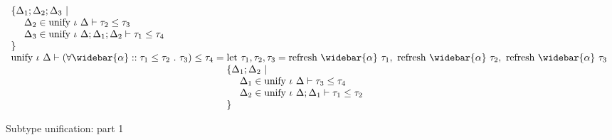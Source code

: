 \documentclass[manuscript]{acmart}
\begin{document}
\begin{figure*}[h]
\[\begin{array}{l @{} l}
\begin{array}[t]{@{} l}
        \{\Delta_1;\Delta_2;\Delta_3\ |
        \\ 
        \ \ \ \ \Delta_2 \in \text{unify } \iota\ \Delta \vdash \tau_2 \leq \tau_3
        \\
        \ \ \ \ \Delta_3 \in \text{unify } \iota\ \Delta;\Delta_1;\Delta_2 \vdash \tau_1 \leq \tau_4
        \\ 
        \}
      \end{array}
      \\
      \text{unify } \iota\ \Delta \vdash
      (\forall \widebar{\alpha} :: \tau_1 \leq \tau_2\ .\ \tau_3)
      \leq 
      \tau_4
      &{} = 
      \begin{array}[t]{@{} l}
        \text{let } \tau_1, \tau_2, \tau_3 = 
        \text{refresh } \widebar{\alpha}\ \tau_1,\ 
        \text{refresh } \widebar{\alpha}\ \tau_2,\ 
        \text{refresh } \widebar{\alpha}\ \tau_3
        \\
        \{\Delta_1;\Delta_2\ |
        \\ 
        \ \ \ \ \Delta_1 \in \text{unify } \iota\ \Delta \vdash \tau_3 \leq \tau_4
        \\
        \ \ \ \ \Delta_2 \in \text{unify } \iota\ \Delta;\Delta_1 \vdash \tau_1 \leq \tau_2
        \\
        \}
      \end{array}

    \end{array}
  \]
  \caption{Subtype unification: part 1}
\end{figure*}
\end{document}
